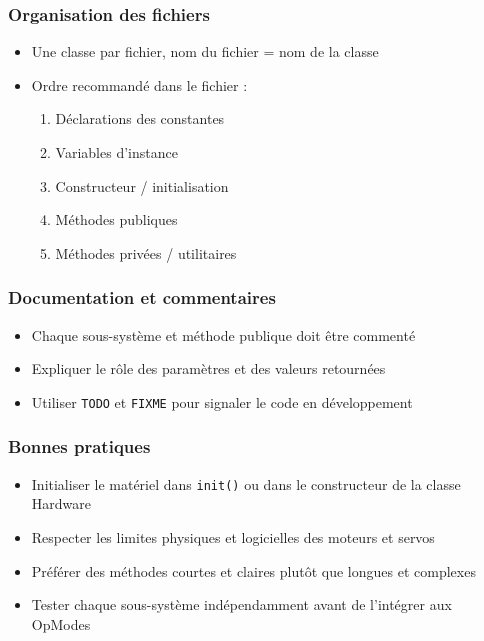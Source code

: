 \documentclass[12pt, a4paper]{report}
\begin{document}

    \subsubsection*{Organisation des fichiers}
    \begin{itemize}
        \item Une classe par fichier, nom du fichier = nom de la classe
        \item Ordre recommandé dans le fichier :
        \begin{enumerate}
            \item Déclarations des constantes
            \item Variables d’instance
            \item Constructeur / initialisation
            \item Méthodes publiques
            \item Méthodes privées / utilitaires
        \end{enumerate}
    \end{itemize}

    \subsubsection*{Documentation et commentaires}
    \begin{itemize}
        \item Chaque sous-système et méthode publique doit être commenté
        \item Expliquer le rôle des paramètres et des valeurs retournées
        \item Utiliser \texttt{TODO} et \texttt{FIXME} pour signaler le code en développement
    \end{itemize}

    \subsubsection*{Bonnes pratiques}
    \begin{itemize}
        \item Initialiser le matériel dans \texttt{init()} ou dans le constructeur de la classe Hardware
        \item Respecter les limites physiques et logicielles des moteurs et servos
        \item Préférer des méthodes courtes et claires plutôt que longues et complexes
        \item Tester chaque sous-système indépendamment avant de l’intégrer aux OpModes
    \end{itemize}
\end{document}
